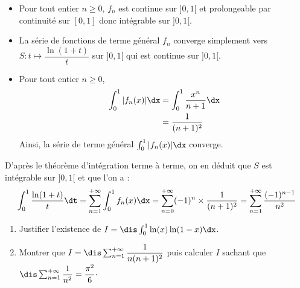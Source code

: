 \documentclass[a4paper,10pt]{report}
\begin{document}
\begin{itemize}
\item Pour tout entier $n \geq 0$, $f_n$ est continue sur $]0,1[$ et prolongeable par continuité sur $[0,1]$ donc intégrable sur $]0,1[$.
\item La série de fonctions de terme général $f_n$ converge simplement vers $S: t \mapsto \dfrac{\ln(1+t)}{t}$ sur $]0,1[$ qui est continue sur $]0,1[$.
\item Pour tout entier $n \geq 0$,
\begin{align*}
\int_0^1 \vert f_n(x) \vert\dx & = \int_0^1 \dfrac{x^n}{n+1} \dx \\
& = \dfrac{1}{(n+1)^2}
\end{align*}
Ainsi, la série de terme général $\int_0^1 \vert f_n(x) \vert\dx$ converge.
\end{itemize}
D'après le théorème d'intégration terme à terme, on en déduit que $S$ est intégrable sur $]0,1[$ et que l'on a :
$$ \int_0^1 \dfrac{\ln(1+t)}{t} \dt = \sum_{n=1}^{+ \infty} \int_0^1 f_n(x) \dx = \sum_{n=0}^{+ \infty} (-1)^{n} \times \dfrac{1}{(n+1)^2} = \sum_{n=1}^{+ \infty} \dfrac{(-1)^{n-1}}{n^2}$$

\begin{Exercice}{}
\begin{enumerate}
\item Justifier l'existence de $I= \dis \int_{0}^1 \ln(x) \ln(1-x) \dx$.
\item Montrer que $I =\dis \sum_{n=1}^{+ \infty} \dfrac{1}{n(n+1)^2}$ puis calculer $I$ sachant que $\dis \sum_{n=1}^{+ \infty} \dfrac{1}{n^2} = \dfrac{\pi^2}{6}\cdot$
\end{enumerate}
\end{Exercice}
\end{document}

